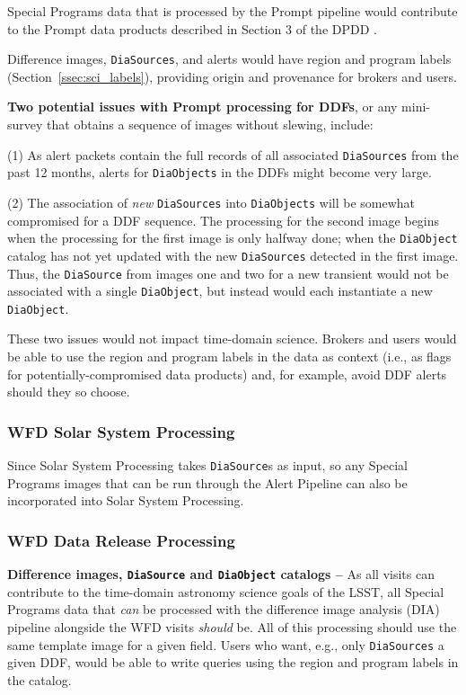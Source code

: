 Special Programs data that is processed by the Prompt pipeline would 
contribute to the Prompt data products described in Section 3 of the 
DPDD . 

Difference images, {\tt DiaSources}, and alerts would have region and 
program labels (Section~\ref{ssec:sci_labels}), providing origin and
provenance for brokers and users.

\textbf{Two potential issues with Prompt processing for DDFs}, 
or any mini-survey that obtains a sequence of images without slewing, 
include:

(1) As alert packets contain the full records of all associated 
{\tt DiaSources} from the past 12 months, alerts for {\tt DiaObjects} in 
the DDFs might become very large.

(2) The association of {\it new} {\tt DiaSources} into {\tt DiaObjects} 
will be somewhat compromised for a DDF sequence.
The processing for the second image begins when the processing for the 
first image is only halfway done; when the {\tt DiaObject} catalog has 
not yet updated with the new {\tt DiaSources} detected in the first image.
Thus, the {\tt DiaSource} from images one and two for a new transient 
would not be associated with a single {\tt DiaObject}, but instead would 
each instantiate a new {\tt DiaObject}.

These two issues would not impact time-domain science.
Brokers and users would be able to use the region and program labels
in the data as context (i.e., as flags for potentially-compromised 
data products) and, for example, avoid DDF alerts should they so choose.


\subsubsection{WFD Solar System Processing}

Since Solar System Processing takes {\tt DiaSource}s as input, so any 
Special Programs images that can be run through the Alert Pipeline can 
also be incorporated into Solar System Processing.


\subsubsection{WFD Data Release Processing}

\textbf{Difference images, {\tt DiaSource} and {\tt DiaObject} catalogs -- }
As all visits can contribute to the time-domain astronomy science goals 
of the LSST, all Special Programs data that {\it can} be processed with 
the difference image analysis (DIA) pipeline alongside the WFD visits 
{\it should} be.
All of this processing should use the same template image for a given
field.
Users who want, e.g., only {\tt DiaSources} a given DDF, would be 
able to write queries using the region and program labels in the catalog.

